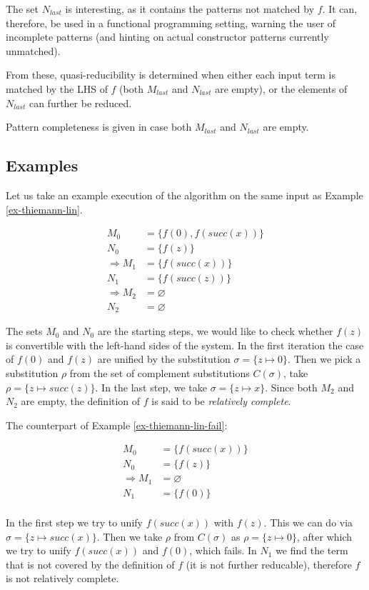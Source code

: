 The set $N_{last}$ is interesting, as it contains the patterns not matched by $f$. It can, therefore, be used in a functional programming setting, warning the user of incomplete patterns (and hinting on actual constructor patterns currently unmatched).

From these, quasi-reducibility is determined when either each input term is matched by the LHS of $f$ (both $M_{last}$ and $N_{last}$ are empty), or the elements of $N_{last}$ can further be reduced.

Pattern completeness is given in case both $M_{last}$ and $N_{last}$ are empty.

\subsection{Examples}
\begin{example} Let us take an example execution of the algorithm on the same input as Example \ref{ex-thiemann-lin}.

\begin{align*}
    M_0 &= \{f(0), f(succ(x))\} \\
    N_0 &= \{f(z)\} \\
    \Rightarrow M_1 &= \{f(succ(x))\} \\
    N_1 &= \{f(succ(z))\} \\
    \Rightarrow M_2 &= \varnothing \\
    N_2 &= \varnothing
\end{align*}

The sets $M_0$ and $N_0$ are the starting steps, we would like to check whether $f(z)$ is convertible with the left-hand sides of the system. In the first iteration the case of $f(0)$ and $f(z)$ are unified by the substitution $\sigma = \{z \mapsto 0\}$. Then we pick a substitution $\rho$ from the set of complement substitutions $C(\sigma)$, take $\rho = \{z \mapsto succ(z)\}$. In the last step, we take $\sigma = \{z \mapsto x\}$. Since both $M_2$ and $N_2$ are empty, the definition of $f$ is said to be \textit{relatively complete}.
\end{example}

\begin{example} The counterpart of Example \ref{ex-thiemann-lin-fail}:

\begin{align*}
    M_0 &= \{f(succ(x))\} \\
    N_0 &= \{f(z)\} \\
    \Rightarrow M_1 &= \varnothing \\
    N_1 &= \{f(0)\} \\
\end{align*}

In the first step we try to unify $f(succ(x))$ with $f(z)$. This we can do via $\sigma = \{z \mapsto succ(x)\}$. Then we take $\rho$ from $C(\sigma)$ as $\rho = \{z \mapsto 0\}$, after which we try to unify $f(succ(x))$ and $f(0)$, which fails. In $N_1$ we find the term that is not covered by the definition of $f$ (it is not further reducable), therefore $f$ is not relatively complete.
\end{example}

